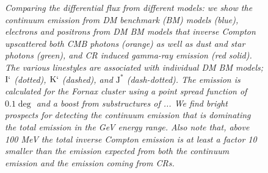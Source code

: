 \documentclass[10pt,aps,pra,reprint,amsmath,amsfonts,amssymb,showpacs]{revtex4-1}
\newcommand{\rmn}{\mathrm}
\newcommand{\Km}{\rmn{K}`}
\newcommand{\Imm}{\rmn{I}`}
\newcommand{\Jm}{\rmn{J}^*}
\begin{document}
\begin{figure}
\begin{minipage}{2.0\columnwidth}
\caption{\it Comparing the differential flux from different models: we
  show the continuum emission from DM benchmark (BM) models
  (blue), electrons and positrons from DM BM models that inverse
  Compton upscattered both CMB photons (orange) as well as dust and
  star photons (green), and CR induced gamma-ray emission (red
  solid). The various linestyles are associated with individual DM BM
  models; $\Imm$ (dotted), $\Km$ (dashed), and $\Jm$
  (dash-dotted). The emission is calculated for the Fornax cluster
  using a point spread function of $0.1\deg$ and a boost from
  substructures of ...  We find bright prospects for detecting the
  continuum emission that is dominating the total emission in the GeV
  energy range. Also note that, above 100 MeV the total inverse
  Compton emission is at least a factor 10 smaller than the emission
  expected from both the continuum emission and the emission coming
  from CRs.}
 \label{fig7}
\end{minipage}
\end{figure}
\end{document}
